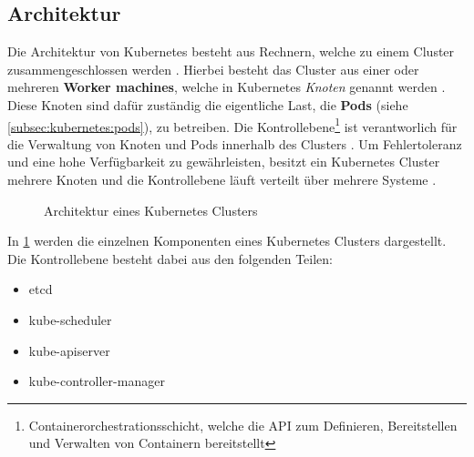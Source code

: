 \subsection{Architektur}
\label{subsec:kubernetes:architecture}
Die Architektur von Kubernetes besteht aus Rechnern, welche zu einem Cluster zusammengeschlossen werden \cite{kubernetesComponents}.
Hierbei besteht das Cluster aus einer oder mehreren \textbf{Worker machines}, welche in Kubernetes \emph{Knoten}
genannt werden \cite{kubernetesComponents}. Diese Knoten sind dafür zuständig die eigentliche Last, die \textbf{Pods} (siehe \ref{subsec:kubernetes:pods}), zu betreiben.
Die Kontrollebene\footnote{Containerorchestrationsschicht, welche die API zum Definieren, Bereitstellen und Verwalten von Containern bereitstellt}
ist verantworlich für die Verwaltung von Knoten und Pods innerhalb des Clusters \cite{kubernetesComponents}. 
Um Fehlertoleranz und eine hohe Verfügbarkeit zu gewährleisten, besitzt ein Kubernetes Cluster mehrere Knoten und
die Kontrollebene läuft verteilt über mehrere Systeme \cite{kubernetesComponents}. 

\begin{figure}
  \centering
  \caption{Architektur eines Kubernetes Clusters}
  \label{fig:kubernetes_architecture}
\end{figure}

In \ref{fig:kubernetes_architecture} werden die einzelnen Komponenten eines Kubernetes Clusters dargestellt.
Die Kontrollebene besteht dabei aus den folgenden Teilen:
\begin{itemize}
  \item etcd
  \item kube-scheduler
  \item kube-apiserver
  \item kube-controller-manager
\end{itemize}

